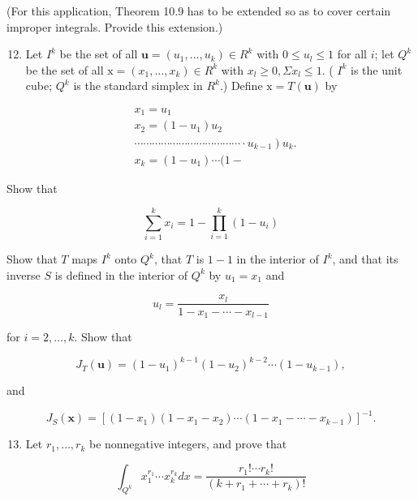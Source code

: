 \documentclass[10pt]{article}
\begin{document}
(For this application, Theorem 10.9 has to be extended so as to cover certain improper integrals. Provide this extension.)

\begin{enumerate}
  \setcounter{enumi}{11}
  \item Let $I^{k}$ be the set of all $\mathbf{u}=\left(u_{1}, \ldots, u_{k}\right) \in R^{k}$ with $0 \leq u_{l} \leq 1$ for all $i$; let $Q^{k}$ be the set of all $\mathrm{x}=\left(x_{1}, \ldots, x_{k}\right) \in R^{k}$ with $x_{l} \geq 0, \Sigma x_{l} \leq 1$. ( $I^{k}$ is the unit cube; $Q^{k}$ is the standard simplex in $R^{k}$.) Define $\mathrm{x}=T(\mathbf{u})$ by
\end{enumerate}

$$
\begin{aligned}
& x_{1}=u_{1} \\
& x_{2}=\left(1-u_{1}\right) u_{2} \\
& \left.\cdots \cdots \cdots \cdots \cdots \cdots \cdots \cdots \cdots \cdots \cdots \cdots \cdot u_{k-1}\right) u_{k} . \\
& x_{k}=\left(1-u_{1}\right) \cdots(1-
\end{aligned}
$$

Show that

$$
\sum_{i=1}^{k} x_{i}=1-\prod_{i=1}^{k}\left(1-u_{i}\right)
$$

Show that $T$ maps $I^{k}$ onto $Q^{k}$, that $T$ is $1-1$ in the interior of $I^{k}$, and that its inverse $S$ is defined in the interior of $Q^{k}$ by $u_{1}=x_{1}$ and

$$
u_{l}=\frac{x_{l}}{1-x_{1}-\cdots-x_{l-1}}
$$

for $i=2, \ldots, k$. Show that

$$
J_{T}(\mathbf{u})=\left(1-u_{1}\right)^{k-1}\left(1-u_{2}\right)^{k-2} \cdots\left(1-u_{k-1}\right),
$$

and

$$
J_{S}(\mathbf{x})=\left[\left(1-x_{1}\right)\left(1-x_{1}-x_{2}\right) \cdots\left(1-x_{1}-\cdots-x_{k-1}\right)\right]^{-1} .
$$

\begin{enumerate}
  \setcounter{enumi}{12}
  \item Let $r_{1}, \ldots, r_{k}$ be nonnegative integers, and prove that
\end{enumerate}

$$
\int_{Q^{k}} x_{1}^{r_{1}} \cdots x_{k}^{r_{k}} d x=\frac{r_{1} ! \cdots r_{k} !}{\left(k+r_{1}+\cdots+r_{k}\right) !}
$$
\end{document}
